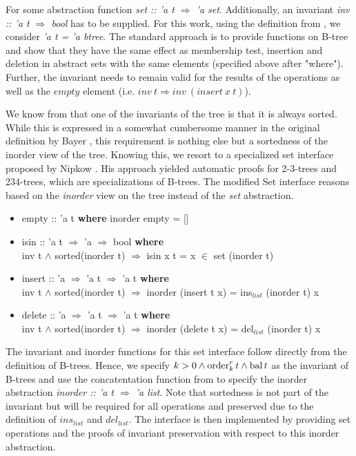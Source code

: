 For some abstraction function \textit{set :: 'a t $\Rightarrow$ 'a set}.
Additionally, an invariant \textit{inv :: 'a t $\Rightarrow$ bool} has to be supplied.
For this work, using the definition from ,
we consider \textit{'a t = 'a btree}.
The standard approach is to provide functions on B-tree and show
that they have the same effect as membership test, insertion and deletion 
in abstract sets with the same elements (specified above after "where").
Further, the invariant needs to remain valid for the results of the operations
as well as the $empty$ element (i.e. $inv\ t \Longrightarrow inv\ (insert\ x\ t)$).

We know from  that one of the invariants
of the tree is that it is always sorted.
While this is expressed in a somewhat cumbersome manner
in the original definition by Bayer \parencite{DBLP:journals/acta/BayerM72},
this requirement is nothing else but a sortedness of the inorder view of the tree.
Knowing this, we resort to a specialized set interface
proposed by Nipkow \parencite{DBLP:conf/itp/Nipkow16}.
His approach yielded automatic proofs for 2-3-trees
and 234-trees, which are specializations of B-trees.
The modified Set interface reasons based on the \textit{inorder}
view on the tree instead of the \textit{set} abstraction.

\begin{itemize}
    \itshape
    \item empty :: 'a t \textup{\textbf{where}} inorder empty = []
    \item isin :: 'a t $\Rightarrow$ 'a $\Rightarrow$ bool \textup{\textbf{where}}\\
     inv t $\wedge$ sorted(inorder t) $\Longrightarrow$ isin x t = x $\in$ set (inorder t)
    \item insert :: 'a $\Rightarrow$ 'a t $\Rightarrow$ 'a t \textup{\textbf{where}}\\
     inv t $\wedge$ sorted(inorder t) $\Longrightarrow$ inorder (insert t x) = ins$_{list}$ (inorder t) x
    \item delete :: 'a $\Rightarrow$ 'a t $\Rightarrow$ 'a t \textup{\textbf{where}}\\
     inv t $\wedge$ sorted(inorder t) $\Longrightarrow$ inorder (delete t x) = del$_{list}$ (inorder t) x
\end{itemize}

The invariant and inorder functions for this set interface
follow directly from the definition of B-trees.
Hence, we specify $k > 0 \wedge \operatorname{order}^r_k t \wedge \operatorname{bal} t$
as the invariant of B-trees and use
the concatentation function from  to specify the
inorder abstraction \textit{inorder :: 'a t $\Rightarrow$ 'a list}.
Note that sortedness is not part of the invariant
but will be required for all operations and preserved
due to the definition of $ins_{list}$ and $del_{list}$.
The interface is then implemented by providing set operations
and the proofs of invariant preservation
with respect to this inorder abstraction.

